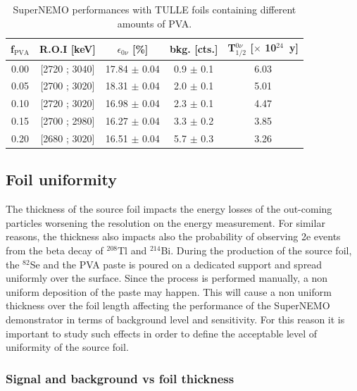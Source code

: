 \documentclass[main.tex]{subfiles}
\begin{document}
\begin{table}
\centering
\begin{tabular}{c|c|c|c|c}
\toprule
f$_{\text{PVA}}$ & R.O.I [keV] & $\epsilon_{\text{0}\nu}$ [\%] & bkg. [cts.] &   T$_{\text{1/2}}^{\text{0}\nu}$ [$\times$ 10$^{\text{24}}$~y] \\[0.1cm]
\hline
0.00 & [2720 ; 3040] & 17.84 $\pm$ 0.04 & 0.9 $\pm$ 0.1 & 6.03 \\ [0.1cm]
\hline
0.05 & [2700 ; 3020] & 18.31 $\pm$ 0.04 & 2.0 $\pm$ 0.1 & 5.01 \\ [0.1cm]
\hline
0.10 & [2720 ; 3020] & 16.98 $\pm$ 0.04 & 2.3 $\pm$ 0.1 & 4.47 \\ [0.1cm]
\hline
0.15 & [2700 ; 2980] & 16.27 $\pm$ 0.04 & 3.3 $\pm$ 0.2 & 3.85 \\ [0.1cm]
\hline
0.20 & [2680 ; 3020] & 16.51 $\pm$ 0.04 & 5.7 $\pm$ 0.3 & 3.26 \\ [0.1cm]
\bottomrule
\end{tabular}
\caption{SuperNEMO performances with TULLE foils containing different amounts of PVA.}
\label{Tab:AmountOfPVA}
\end{table}


\FloatBarrier


\subsection{Foil uniformity}\label{sec:FoilUniformity}


\NI The thickness of the source foil impacts the energy losses of the out-coming particles worsening the resolution on the energy measurement. For similar reasons, the thickness also impacts also the probability of observing 2e events from the beta decay of $^{\text{208}}$Tl and $^{\text{214}}$Bi. During the production of the source foil, the $^{\text{82}}$Se and the PVA paste is poured on a dedicated support and spread uniformly over the surface. Since the process is performed manually, a non uniform deposition of the paste may happen. This will cause a non uniform thickness over the foil length affecting the performance of the SuperNEMO demonstrator in terms of background level and sensitivity. For this reason it is important to study such effects in order to define the acceptable level of uniformity of the source foil.


\subsubsection{Signal and background vs foil thickness}
\end{document}
